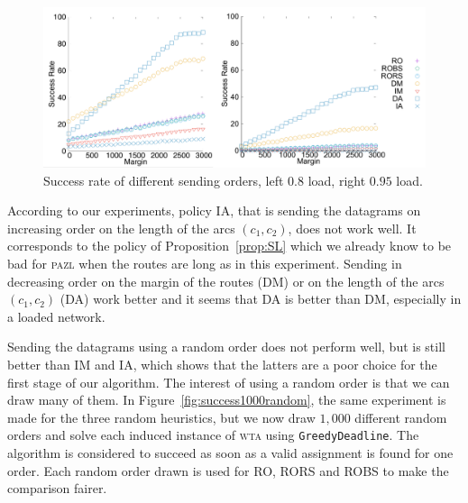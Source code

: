 \documentclass[a4paper,10pt]{journal}
\newcommand\greedydeadline{\texttt{GreedyDeadline}\xspace}
\newcommand\pazl{\textsc{pazl}\xspace}
\newcommand\wta{\textsc{wta}\xspace}
\begin{document}
 
\begin{figure}[h] 
\begin{center} 

  \includegraphics[width=\linewidth]{departs_gp.pdf}


      \caption{Success rate of different sending orders, left $0.8$ load, right $0.95$ load.}
           \label{fig:success1random}
           \end{center}

     \end{figure}

          
     According to our experiments, policy IA, that is sending the datagrams on increasing order on the length of the arcs $(c_1,c_2)$, does not work well. It corresponds to the policy of Proposition~\ref{prop:SL} which we already know to be bad for \pazl when the routes are long as in this experiment. Sending in decreasing order on the margin of the routes (DM) or on the length of the arcs $(c_1,c_2)$ (DA) work better and it seems that DA is better than DM, especially in a loaded network. 
     
     Sending the datagrams using a random order does not perform well,
     but is still better than IM and IA, which shows that the latters are a poor choice for the first stage of our algorithm. The interest of using a random order is that we can draw many of them. In Figure~\ref{fig:success1000random}, the same experiment is made for the three random heuristics, but we now draw $1,000$ different random orders and solve each induced instance of \wta using \greedydeadline. The algorithm is considered to succeed as soon as a valid assignment is found for one order. Each random order drawn is used for RO, RORS and ROBS to make the comparison fairer.
\end{document}
